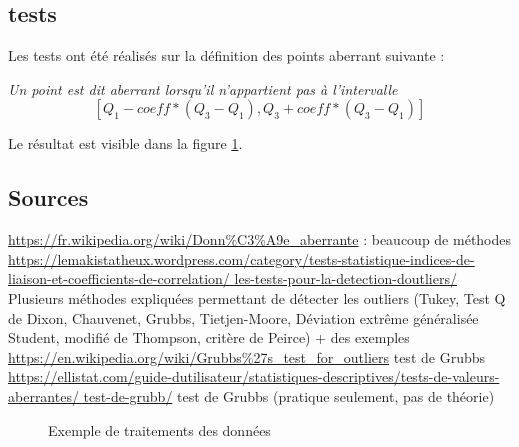 \documentclass[a4paper,12pt]{article} %
\begin{document}
\subsection{tests}

Les tests ont été réalisés sur la définition des points aberrant suivante :

\emph{Un point est dit aberrant lorsqu'il n'appartient pas à l'intervalle }
\[[Q_1 - coeff*(Q_3 - Q_1) , Q_3 +coeff*(Q_3 - Q_1)]\]

Le résultat est visible dans la figure \ref{suppr}.

\subsection{Sources}
\url{https://fr.wikipedia.org/wiki/Donn\%C3\%A9e_aberrante} : beaucoup de méthodes \\
\url{https://lemakistatheux.wordpress.com/category/tests-statistique-indices-de-liaison-et-coefficients-de-correlation/ les-tests-pour-la-detection-doutliers/} Plusieurs méthodes expliquées permettant de détecter les outliers (Tukey, Test Q de Dixon, Chauvenet, Grubbs, Tietjen-Moore, Déviation extrême généralisée Student, modiﬁé de Thompson, critère de Peirce) + des exemples \\
\url{ https://en.wikipedia.org/wiki/Grubbs\%27s_test_for_outliers} test de Grubbs \\
\url{https://ellistat.com/guide-dutilisateur/statistiques-descriptives/tests-de-valeurs-aberrantes/ test-de-grubb/} test de Grubbs (pratique seulement, pas de théorie)

\begin{figure}
\begin{center}
\end{center}
\caption{Exemple de traitements des données}
\label{suppr}
\end{figure}
\end{document}
